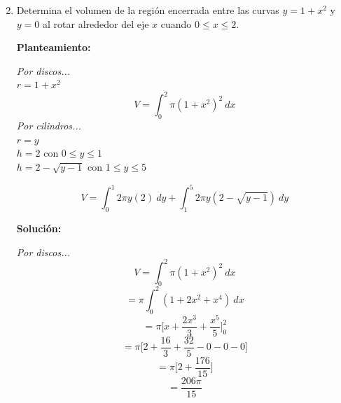 \documentclass[10pt,letterpaper]{article}
\begin{document}
\begin{enumerate}
\begin{multicols}{2}
\end{multicols}

\newpage

\item Determina el volumen de la región encerrada entre las curvas $y = 1 + x^2$ y $y = 0$ al rotar
      alrededor del eje $x$ cuando $0 \leq x \leq 2$.

\begin{multicols}{2}


\textbf{Planteamiento:}

\textit{Por discos...} \\
$r = 1+x^2$ \\
$$V = \int_{0}^{2} \pi (1+x^2)^2\ dx$$
\textit{Por cilindros...} \\
$r = y$ \\
$h = 2$ con $0 \leq y \leq 1$ \\
$h = 2 - \sqrt{y-1}$ con $1 \leq y \leq 5$

$$V = \int_{0}^{1} 2\pi y (2)\ dy + \int_{1}^{5} 2\pi y (2-\sqrt{y-1})\ dy$$

\textbf{Solución:}

\textit{Por discos...}
$$V = \int_{0}^{2} \pi (1+x^2)^2\ dx$$
$$= \pi \int_{0}^{2} (1 + 2x^2 + x^4)\ dx$$
$$= \pi \bigg[ x + \frac{2x^3}{3} + \frac{x^5}{5} \bigg]_{0}^{2}$$
$$= \pi \bigg[ 2 + \frac{16}{3} + \frac{32}{5} - 0 - 0 - 0 \bigg]$$
$$= \pi \bigg[ 2 + \frac{176}{15} \bigg]$$
$$= \frac{206\pi}{15}$$



\end{multicols}
\end{enumerate}
\end{document}
